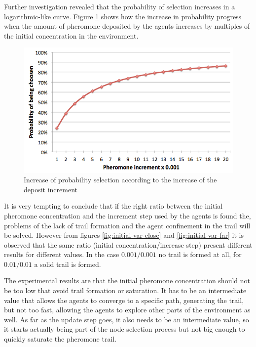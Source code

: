 Further investigation revealed that the probability of selection increases in a logarithmic-like curve. Figure \ref{fig:prob-inc} shows how the increase in probability progress when the amount of pheromone deposited by the agents increases by multiples of the initial concentration in the environment.

\begin{figure}[H]
  \centering
  \includegraphics[width=0.6\linewidth]{gfx/probability-increase.png}
  \caption[Selection probability increasing]{Increase of probability selection according to the increase of the deposit increment}
  \label{fig:prob-inc}
\end{figure}

It is very tempting to conclude that if the right ratio between the initial pheromone concentration and the increment step used by the agents is found the, problems of the lack of trail formation and the agent confinement in the trail will be solved. However from figures \ref{fig:initial-var-close} and \ref{fig:initial-var-far} it is observed that the same ratio (initial concentration/increase step) present different results for different values. In the case $0.001/0.001$ no trail is formed at all, for $0.01/0.01$ a solid trail is formed. 

The experimental results are that the initial pheromone concentration should not be too low that avoid trail formation or saturation. It has to be an intermediate value that allows the agents to converge to a specific path, generating the trail, but not too fast, allowing the agents to explore other parts of the environment as well. As far as the update step goes, it also needs to be an intermediate value, so it starts actually being part of the node selection process but not big enough to quickly saturate the pheromone trail.

